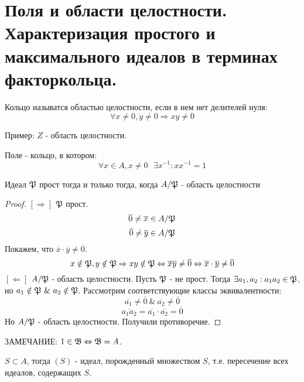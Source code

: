\section{Поля и области целостности. Характеризация простого и максимального идеалов в терминах факторкольца.}

\begin{defn}
Кольцо называтся областью целостности, если в нем нет делителей нуля:
\[\forall x \neq 0, y \neq 0 \Rightarrow xy \neq 0\]
\end{defn}

Пример: $Z$ - область целостности.

\begin{defn}
Поле - кольцо, в котором:
\[\forall x \in A, x \neq 0~~~\exists x^{-1}: xx^{-1} = 1\]
\end{defn}

\begin{thm}
Идеал $\mathfrak{P}$ прост тогда и только тогда, когда $A/\mathfrak{P}$ - область целостности
\end{thm}
\begin{proof}
$[\Rightarrow]$ $\mathfrak{P}$ прост.
\[\overline{0} \neq \overline{x} \in A/\mathfrak{P}\]
\[\overline{0} \neq \overline{y} \in A/\mathfrak{P}\]
Покажем, что $\overline{x} \cdot \overline{y} \neq \overline{0}$.
\[x \notin \mathfrak{P}, y \notin \mathfrak{P} \Rightarrow xy \notin \mathfrak{P} \Leftrightarrow \overline{xy} \neq \overline{0}
\Leftrightarrow \overline{x}\cdot\overline{y} \neq \overline{0}\]
$[\Leftarrow]$ $A/\mathfrak{P}$ - область целостности. Пусть $\mathfrak{P}$ - не прост. Тогда $\exists a_1, a_2: a_1a_2 \in \mathfrak{P}$,
но $a_1 \notin \mathfrak{P}~\&~a_2 \notin \mathfrak{P}$. Рассмотрим соответствующие классы эквивалентности:
\[\overline{a_1} \neq \overline{0}~\&~\overline{a_2} \neq \overline{0} \]
\[\overline{a_1a_2} = \overline{a_1}\cdot\overline{a_2} = \overline{0}\]
Но $A/\mathfrak{P}$ - область целостности. Получили противоречие.
\end{proof}

ЗАМЕЧАНИЕ: $1 \in \mathfrak{B} \Leftrightarrow \mathfrak{B} = A$.

\begin{defn}
$S \subset A$, тогда $(S)$ - идеал, порожденный множеством $S$, т.е. пересечение всех идеалов, содержащих $S$.
\end{defn}


